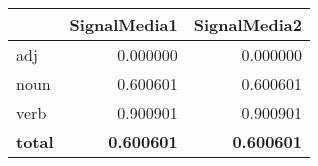 \begin{tabular}{lrr}
\toprule
{} &  SignalMedia1 &  SignalMedia2 \\
\midrule
adj   &      0.000000 &      0.000000 \\
noun  &      0.600601 &      0.600601 \\
verb  &      0.900901 &      0.900901 \\
\textbf{total} &      \textbf{0.600601} &      \textbf{0.600601} \\
\bottomrule
\end{tabular}
